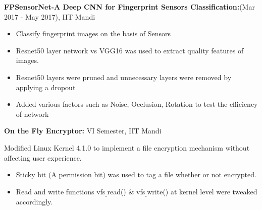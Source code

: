\documentclass[letterpaper,11pt]{article}
\newcommand{\resumeNewItem}[3]{
  \item\small{
    \textbf{#1:}{\hfill {#2}\\}{ #3\vspace{-2pt}}
  }
}
\newcommand{\resumeNewSubItem}[3]{\resumeNewItem{#1}{#2}{#3}\vspace{-4pt}}
\begin{document}
    \resumeNewSubItem{FPSensorNet-A Deep CNN for Fingerprint Sensors Classification}{(Mar 2017 - May 2017), IIT Mandi}{
        \begin{itemize} 
          \item Classify fingerprint images on the basis of Sensors
          \item Resnet50 layer network vs VGG16 was used to extract quality features of images.
          \item Resnet50 layers were pruned and unnecessary layers were removed by applying a dropout 
          \item Added various factors such as Noise, Occlusion, Rotation to test the efficiency of network
        \end{itemize}
    }
    \resumeNewSubItem{On the Fly Encryptor}{ VI Semester, IIT Mandi}{
        Modified Linux Kernel 4.1.0 to implement a file encryption mechanism without affecting user experience. 
        \begin{itemize} 
          \item Sticky bit (A permission bit) was used to tag a file whether or not encrypted.
          \item Read and write functions vfs$_{\_}$read() \& vfs$_{\_}$write()  at kernel level were tweaked accordingly.
           \end{itemize}
       
    }
\end{document}
